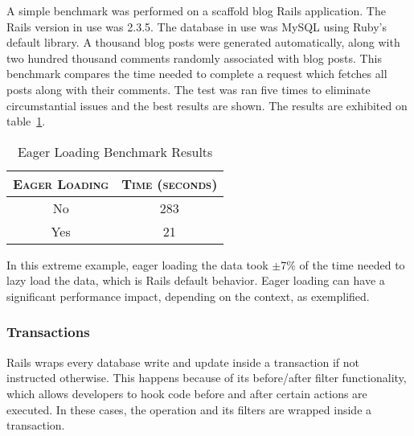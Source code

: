 A simple benchmark was performed on a scaffold blog Rails application. The Rails version in use was 2.3.5. The database in use was MySQL using Ruby's default library. A thousand blog posts were generated automatically, along with two hundred thousand comments randomly associated with blog posts. This benchmark compares the time needed to complete a request which fetches all posts along with their comments. The test was ran five times to eliminate circumstantial issues and the best results are shown. The results are exhibited on table~\ref{tab:eager_loading}.
\begin{table}[h!t]
  \centering
  \caption{Eager Loading Benchmark Results}
  \label{tab:eager_loading}
  
  \begin{tabular}{c|c}
  
    \textbf{\textsc{Eager Loading}} & \textbf{\textsc{Time (seconds)}} \\
    \hline
    No & 283 \\ \hline
    Yes & 21 \\
  \end{tabular}
\end{table}

In this extreme example, eager loading the data took $\pm$7\% of the time needed to lazy load the data, which is Rails default behavior. Eager loading can have a significant performance impact, depending on the context, as exemplified.


\subsubsection{Transactions}
Rails wraps every database write and update inside a transaction if not instructed otherwise. This happens because of its before/after filter functionality, which allows developers to hook code before and after certain actions are executed. In these cases, the operation and its filters are wrapped inside a transaction.

